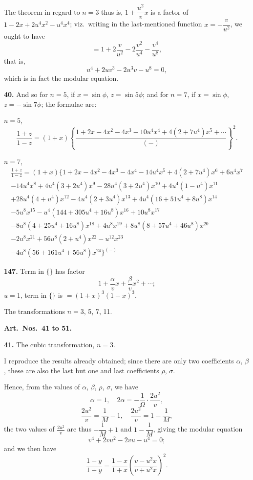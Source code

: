 \documentclass[11pt,a4paper]{book}
\begin{document}
The theorem in regard to $n = 3$ thus is, $1 + \dfrac{u^2}{v}x$ is a factor of $1 - 2x + 2u^4x^2 - u^4x^4$; viz.\ writing in the last-mentioned function $x = -\dfrac{v}{u^2}$, we ought to have
\[
= 1 + 2\frac{v}{u^2} - 2\frac{v^2}{u^4} - \frac{v^4}{u^8},
\]
that is,
\[
u^4 + 2uv^3 - 2u^3v - u^8 = 0,
\]
which is in fact the modular equation.

\medskip
\noindent\textbf{40.} And so for $n = 5$, if $x = \sin\phi$, $z = \sin 5\phi$; and for $n = 7$, if $x = \sin\phi$, $z = -\sin 7\phi$; the formulae are:

\medskip
$n = 5$,
\[
\frac{1 + z}{1 - z} = (1 + x)\left\{\frac{1 + 2x - 4x^2 - 4x^3 - 10u^4x^4 + 4(2 + 7u^4)x^5 + \cdots}{(-)}\right\}^2.
\]

$n = 7$,
\begin{multline*}
\frac{1 + z}{1 - z} = (1 + x)\{1 + 2x - 4x^2 - 4x^3 - 4x^4 - 14u^4x^5 + 4(2 + 7u^4)x^6 + 6u^4x^7 \\
- 14u^4x^8 + 4u^4(3 + 2u^4)x^9 - 28u^4(3 + 2u^4)x^{10} + 4u^4(1 - u^4)x^{11} \\
+ 28u^4(4 + u^4)x^{12} - 4u^4(2 + 3u^4)x^{13} + 4u^4(16 + 51u^4 + 8u^8)x^{14} \\
- 5u^8x^{15} - u^4(144 + 305u^4 + 16u^8)x^{16} + 10u^8x^{17} \\
- 8u^8(4 + 25u^4 + 16u^8)x^{18} + 4u^8x^{19} + 8u^8(8 + 57u^4 + 46u^8)x^{20} \\
- 2u^8x^{21} + 56u^8(2 + u^4)x^{22} - u^{12}x^{23} \\
- 4u^8(56 + 161u^4 + 56u^8)x^{24}\}^{(-)}
\end{multline*}


\noindent\textbf{147.} Term in $\{\}$ has factor
\[
1 + \frac{\alpha}{v}x + \frac{\beta}{v}x^2 + \cdots;
\]
$u = 1$, term in $\{\}$ is $= (1 + x)^3(1 - x)^3$.

The transformations $n = 3$, 5, 7, 11.

\medskip
\noindent\textbf{Art.~Nos.~41 to 51.}

\medskip
\noindent\textbf{41.} The cubic transformation, $n = 3$.

I reproduce the results already obtained; since there are only two coefficients $\alpha$, $\beta$, these are also the last but one and last coefficients $\rho$, $\sigma$.

Hence, from the values of $\alpha$, $\beta$, $\rho$, $\sigma$, we have
\[
\alpha = 1, \quad 2\alpha = -\frac{1}{\Omega} \cdot \frac{2u^2}{v},
\]
\[
\frac{2u^2}{v} = \frac{1}{M} - 1, \quad \frac{2u^2}{v} = 1 - \frac{1}{M},
\]
the two values of $\frac{2u^2}{v}$ are thus $-\dfrac{1}{M} + 1$ and $1 - \dfrac{1}{M}$, giving the modular equation
\[
v^4 + 2vu^2 - 2vu - u^4 = 0;
\]
and we then have
\[
\frac{1 - y}{1 + y} = \frac{1 - x}{1 + x}\left(\frac{v - u^2x}{v + u^2x}\right)^2.
\]
\end{document}
